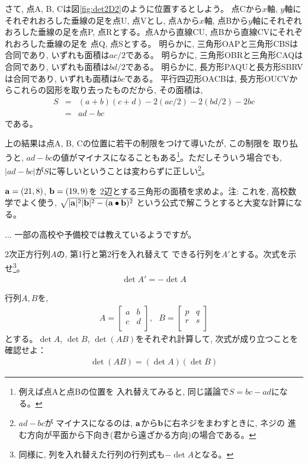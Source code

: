 さて, 点A, B, Cは図\ref{fig:det2D2}のように位置するとしよう。
点Cから$x$軸, $y$軸にそれぞれおろした垂線の足を点U, 点Vとし, 点Aから$x$軸, 点Bから$y$軸にそれぞれ
おろした垂線の足を点P, 点Rとする。点Aから直線CU, 点Bから直線CVにそれぞれおろした垂線の足を
点Q, 点Sとする。
明らかに, 三角形OAPと三角形CBSは合同であり, いずれも面積は$ac/2$である。
明らかに, 三角形OBRと三角形CAQは合同であり, いずれも面積は$bd/2$である。
明らかに, 長方形PAQUと長方形SBRVは合同であり, いずれも面積は$bc$である。
平行四辺形OACBは, 長方形OUCVからこれらの図形を取り去ったものだから, その面積は,
\begin{eqnarray*}
S&=&(a+b)(c+d)-2(ac/2)-2(bd/2)-2bc\\
 &=&ad-bc
\end{eqnarray*}
である。

上の結果は点A, B, Cの位置に若干の制限をつけて導いたが, この制限を
取り払うと, $ad-bc$の値がマイナスになることもある\footnote{例えば点Aと点Bの位置を
入れ替えてみると, 同じ議論で$S=bc-ad$になる。}。ただしそういう場合でも, 
$|ad-bc|$が$S$に等しいということは変わらずに正しい\footnote{$ad-bc$が
マイナスになるのは, ${\bf a}$から${\bf b}$に右ネジをまわすときに, ネジの
進む方向が平面から下向き(君から遠ざかる方向)の場合である。}。

\begin{q}\label{q:matrix_triangle_area} ${\bf a}=(21, 8)$, ${\bf b}=(19, 9)$を
2辺とする三角形の面積を求めよ。注: これを, 高校数学でよく使う, 
$\sqrt{|{\bf a}|^2|{\bf b}|^2-({\bf a}\bullet{\bf b})^2}$
という公式で解こうとすると大変な計算になる。
\end{q}

\begin{faq}{\small{}
... 一部の高校や予備校では教えているようですが。}\end{faq}

\begin{q}\label{q:matrix_det_swap2D} 2次正方行列$A$の, 第1行と第2行を入れ替えて
できる行列を$A'$とする。次式を示せ\footnote{同様に, 列を入れ替えた行列の行列式も$-\det A$となる。}。
\begin{eqnarray}
\det A'=-\det A
\end{eqnarray}
\end{q}

\begin{q}\label{q:matrix_detAB_detBA_2D} 行列$A, B$を, 
\begin{eqnarray} 
A=\begin{bmatrix}
a & b \\
c & d \\
\end{bmatrix},\,\,\,\,
B=\begin{bmatrix}
p & q \\
r & s \\
\end{bmatrix}
\end{eqnarray}
とする。$\det A$, $\det B$, $\det (AB)$をそれぞれ計算して, 次式が成り立つことを確認せよ：
\begin{eqnarray}
\det (AB)=(\det A)(\det B)\label{eq:detABdetAdetB}
\end{eqnarray}
\end{q}\mv

